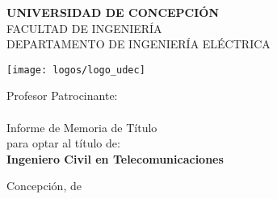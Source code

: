 \begin{titlepage}
\begingroup

\linespread{1}\selectfont
\setlength{\parskip}{0pt}
	
{ \vspace*{2 pc} }

\begin{center}
	\textbf{\LARGE UNIVERSIDAD DE CONCEPCIÓN} \\[0.4 pc]
	{\large FACULTAD DE INGENIERÍA} \\[0.4 pc]
	{ DEPARTAMENTO DE INGENIERÍA ELÉCTRICA} \\[0.4 pc]
\end{center}

\vspace{6 pc}

\noindent\begin{minipage}{0.35\textwidth}\hfill\end{minipage}
%
\begin{minipage}[t]{0.25\textwidth}
	\centering
	\texttt{[image: logos/logo\_udec]}
\end{minipage}
%
\hspace*{0.5cm}
%
\begin{minipage}{0.34\textwidth}
	Profesor Patrocinante: \\[0.4 pc] \textbf{\AdvisorNameA} \\
	\vskip 4.3cm
	Informe de Memoria de Título \\
	para optar al título de: \\[0.4 pc]
	\textbf{Ingeniero Civil en Telecomunicaciones}
\end{minipage}

\vspace{9 pc}

\begin{center}
	\textbf{\LARGE \MainTitle}
\end{center}
%
%
\vfill
Concepción,
\ifdefined\MyCustomDate
	\MyCustomDate
\else
	{\monthname} de \the\year
\fi
\hfill \AuthorName
%
%
\endgroup
\end{titlepage}
